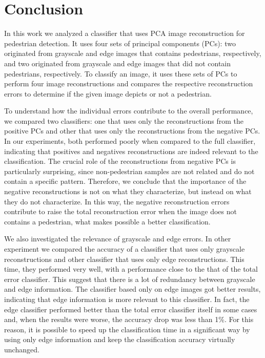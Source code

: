 \documentclass[10pt, conference, compsocconf]{IEEEtran}
\begin{document}
\section{Conclusion}

In this work we analyzed a classifier that uses PCA image reconstruction for pedestrian detection. It uses four sets of principal components (PCs): two originated from grayscale and edge images that contains pedestrians, respectively, and two originated from grayscale and edge images that did not contain pedestrians, respectively. To classify an image, it uses these sets of PCs to perform four image reconstructions and compares the respective reconstruction errors to determine if the given image depicts or not a pedestrian.

To understand how the individual errors contribute to the overall performance, we compared two classifiers: one that uses only the reconstructions from the positive PCs and other that uses only the reconstructions from the negative PCs. In our experiments, both performed poorly when compared to the full classifier, indicating that positives and negatives reconstructions are indeed relevant to the classification. The crucial role of the reconstructions from negative PCs is particularly surprising, since non-pedestrian samples are not related and do not contain a specific pattern. Therefore, we conclude that the importance of the negative reconstructions is not on what they characterize, but instead on what they do not characterize. In this way, the negative reconstruction errors contribute to raise the total reconstruction error when the image does not contains a pedestrian, what makes possible a better classification.

We also investigated the relevance of grayscale and edge errors. In other experiment we compared the accuracy of a classifier that uses only grayscale reconstructions and other classifier that uses only edge reconstructions. This time, they performed very well, with a performance close to the that of the total error classifier. This suggest that there is a lot of redundancy between grayscale and edge information. The classifier based only on edge images got better results, indicating that edge information is more relevant to this classifier. In fact, the edge classifier performed better than the total error classifier itself in some cases and, when the results were worse, the accuracy drop was less than 1\%. For this reason, it is possible to speed up the classification time in a significant way by using only edge information and keep the classification accuracy virtually unchanged.
\end{document}

